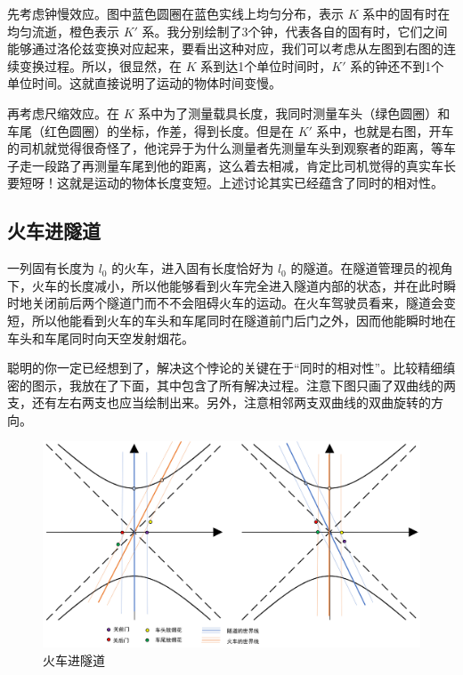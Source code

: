 \documentclass[12pt, a4paper, oneside]{ctexbook}
\begin{document}
\par 先考虑钟慢效应。图中蓝色圆圈在蓝色实线上均匀分布，表示 $K$ 系中的固有时在均匀流逝，橙色表示 $K'$ 系。我分别绘制了3个钟，代表各自的固有时，它们之间能够通过洛伦兹变换对应起来，要看出这种对应，我们可以考虑从左图到右图的连续变换过程。所以，很显然，在 $K$ 系到达1个单位时间时，$K'$ 系的钟还不到1个单位时间。这就直接说明了运动的物体时间变慢。

\par 再考虑尺缩效应。在 $K$ 系中为了测量载具长度，我同时测量车头（绿色圆圈）和车尾（红色圆圈）的坐标，作差，得到长度。但是在 $K'$ 系中，也就是右图，开车的司机就觉得很奇怪了，他诧异于为什么测量者先测量车头到观察者的距离，等车子走一段路了再测量车尾到他的距离，这么着去相减，肯定比司机觉得的真实车长要短呀！这就是运动的物体长度变短。上述讨论其实已经蕴含了同时的相对性。


\subsection{火车进隧道}

一列固有长度为 $l_{0}$ 的火车，进入固有长度恰好为 $l_{0}$ 的隧道。在隧道管理员的视角下，火车的长度减小，所以他能够看到火车完全进入隧道内部的状态，并在此时瞬时地关闭前后两个隧道门而不不会阻碍火车的运动。在火车驾驶员看来，隧道会变短，所以他能看到火车的车头和车尾同时在隧道前门后门之外，因而他能瞬时地在车头和车尾同时向天空发射烟花。

\par 聪明的你一定已经想到了，解决这个悖论的关键在于“同时的相对性”。比较精细缜密的图示，我放在了下面，其中包含了所有解决过程。注意下图只画了双曲线的两支，还有左右两支也应当绘制出来。另外，注意相邻两支双曲线的双曲旋转的方向。
\begin{figure}[H]
	\centering
	\includegraphics[scale=0.4]{figures/train-pass-tunnel.png}
	\caption{火车进隧道}
\end{figure}
\end{document}

